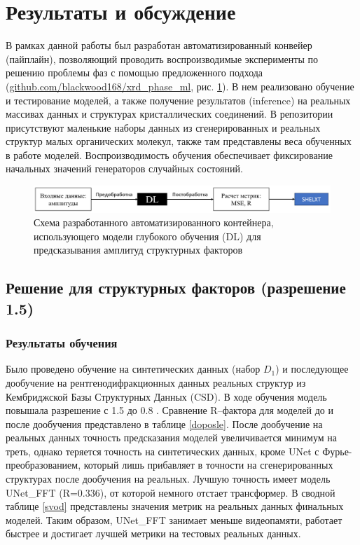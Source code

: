 \section{Результаты и обсуждение}

В рамках данной работы был разработан автоматизированный конвейер (пайплайн), позволяющий проводить воспроизводимые эксперименты по решению проблемы фаз с помощью предложенного подхода (\url{github.com/blackwood168/xrd_phase_ml}, рис. \ref{pipeline}). В нем реализовано обучение и тестирование моделей, а также получение результатов (inference) на реальных массивах данных и структурах кристаллических соединений. В репозитории присутствуют маленькие наборы данных из сгенерированных и реальных структур малых органических молекул, также там представлены веса обученных в работе моделей. Воспроизводимость обучения обеспечивает фиксирование начальных значений генераторов случайных состояний.

\begin{figure}[H]
    \centering
    \includegraphics[width=1\textwidth]{figures/pipeline.png}
    \caption{Схема разработанного автоматизированного контейнера, использующего модели глубокого обучения (DL) для предсказывания амплитуд структурных факторов}
    \label{pipeline}
\end{figure}


\subsection{Решение для структурных факторов (разрешение 1.5\angstrom)}

\subsubsection{Результаты обучения}

Было проведено обучение на синтетических данных (набор $D_1$) и последующее дообучение на рентгенодифракционных данных реальных структур из Кембриджской Базы Структурных Данных (CSD). В ходе обучения модель повышала разрешение с 1.5 до 0.8 \angstrom. Сравнение R--фактора для моделей до и после дообучения представлено в таблице \ref{doposle}. После дообучение на реальных данных точность предсказания моделей увеличивается минимум на треть, однако теряется точность на синтетических данных, кроме UNet с Фурье-преобразованием, который лишь прибавляет в точности на сгенерированных структурах после дообучения на реальных. Лучшую точность имеет модель UNet\_FFT (R=0.336), от которой немного отстает трансформер. В сводной таблице \ref{svod} представлены значения метрик на реальных данных финальных моделей. Таким образом, UNet\_FFT занимает меньше видеопамяти, работает быстрее и достигает лучшей метрики на тестовых реальных данных.

